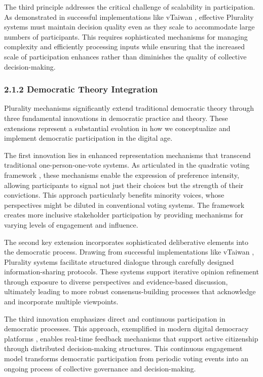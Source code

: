 The third principle addresses the critical challenge of scalability in participation. As demonstrated in successful implementations like vTaiwan \citep{vtaiwan2023}, effective Plurality systems must maintain decision quality even as they scale to accommodate large numbers of participants. This requires sophisticated mechanisms for managing complexity and efficiently processing inputs while ensuring that the increased scale of participation enhances rather than diminishes the quality of collective decision-making.

\hypertarget{democratic-theory-integration}{%
\subsubsection{2.1.2 Democratic Theory Integration}\label{democratic-theory-integration}}

Plurality mechanisms significantly extend traditional democratic theory through three fundamental innovations in democratic practice and theory. These extensions represent a substantial evolution in how we conceptualize and implement democratic participation in the digital age.

The first innovation lies in enhanced representation mechanisms that transcend traditional one-person-one-vote systems. As articulated in the quadratic voting framework \citep{buterin2019flexible}, these mechanisms enable the expression of preference intensity, allowing participants to signal not just their choices but the strength of their convictions. This approach particularly benefits minority voices, whose perspectives might be diluted in conventional voting systems. The framework creates more inclusive stakeholder participation by providing mechanisms for varying levels of engagement and influence.

The second key extension incorporates sophisticated deliberative elements into the democratic process. Drawing from successful implementations like vTaiwan \citep{vtaiwan2023}, Plurality systems facilitate structured dialogue through carefully designed information-sharing protocols. These systems support iterative opinion refinement through exposure to diverse perspectives and evidence-based discussion, ultimately leading to more robust consensus-building processes that acknowledge and incorporate multiple viewpoints.

The third innovation emphasizes direct and continuous participation in democratic processes. This approach, exemplified in modern digital democracy platforms \citep{polis2024}, enables real-time feedback mechanisms that support active citizenship through distributed decision-making structures. This continuous engagement model transforms democratic participation from periodic voting events into an ongoing process of collective governance and decision-making.

